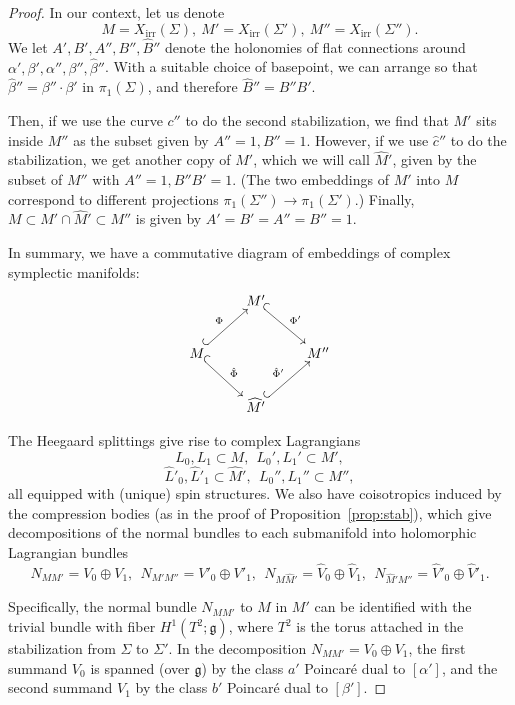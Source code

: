 \documentclass [11pt]{amsart}
\theoremstyle{remark}
\def\g{\mathfrak{g}}
\def\Char {X}
\def\CharIrr {\Char_{\operatorname{irr}}}
\begin{document}
\begin{proof}
In our context, let us denote
$$M=\CharIrr(\Sigma), \ M' = \CharIrr(\Sigma'), \ M''=\CharIrr(\Sigma'').$$
We let $A', B', A'', B'', \hat{B}''$ denote the holonomies of flat connections around $\alpha', \beta', \alpha'', \beta'', \hat{\beta}''$. With a suitable choice of basepoint, we can arrange so that $\hat{\beta}'' = \beta''\cdot \beta'$ in $\pi_1(\Sigma)$, and therefore $\hat{B}''=B''B'$. 

Then, if we use the curve $c''$ to do the second stabilization, we find that $M'$ sits inside $M''$ as the subset given by $A''=1, B'' =1.$ However, if we use $\hat{c}''$ to do the stabilization, we get another copy of $M'$, which we will call $\widehat{M}'$, given by the subset of $M''$ with $A''=1, B''B' = 1.$ (The two embeddings of $M'$ into $M$ correspond to different projections $\pi_1(\Sigma'') \to \pi_1(\Sigma')$.) Finally, $M \subset M' \cap \widehat{M}' \subset M''$ is given by $A' = B' = A'' = B'' = 1.$

In summary, we have a commutative diagram of embeddings of complex symplectic manifolds:
$$
\xymatrix{
& M'  \ar@{^{(}->}^{\Phi'} [rd] & \\
M \ar@{^{(}->}^{\Phi} [ru]  \ar@{^{(}->}^{\hat{\Phi}} [rd] & & M'' \\
& \widehat{M}'  \ar@{^{(}->}^{\hat{\Phi}'} [ru] &
}$$

The Heegaard splittings give rise to complex Lagrangians
$$ L_0, L_1 \subset M, \ \ L_0', L_1' \subset M', $$
$$ \hat{L}'_0, \hat{L}'_1 \subset \widehat{M}', \ \ L_0'', L_1'' \subset M'',$$
all equipped with (unique) spin structures. We also have coisotropics induced by the compression bodies (as in the proof of Proposition~\ref{prop:stab}), which give decompositions of the normal bundles to each submanifold into holomorphic Lagrangian bundles
\begin{equation}
\label{eq:normals}
 N_{MM'} = V_0 \oplus V_1, \ \ N_{M'M''} = V'_0 \oplus V'_1, \ \ N_{M\widehat{M}'} = \widehat{V}_0 \oplus \widehat{V}_1, \ \ N_{\widehat{M}'M''} = \widehat{V}'_0 \oplus \widehat{V}'_1.
 \end{equation}

Specifically, the normal bundle $N_{MM'}$ to $M$ in $M'$ can be identified with the trivial bundle with fiber $H^1(T^2; \g)$, where $T^2$ is the torus attached in the stabilization from $\Sigma$ to $\Sigma'$. In the decomposition $N_{MM'} = V_0 \oplus V_1$, the first summand $V_0$ is spanned (over $\g$) by the class $a'$ Poincar\'e dual to $[\alpha']$, and the second summand $V_1$ by the class $b'$ Poincar\'e dual to $[\beta']$.


\end{proof}
\end{document}
